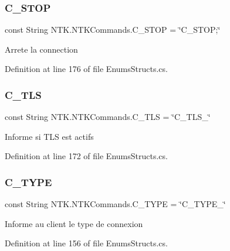 \subsubsection{\texorpdfstring{C\_STOP}{C\_STOP}}
{\footnotesize\ttfamily const String N\+T\+K.\+N\+T\+K\+Commands.\+C\+\_\+\+S\+T\+OP = \char`\"{}C\+\_\+\+S\+T\+OP;\char`\"{}}



Arrete la connection 



Definition at line 176 of file Enums\+Structs.\+cs.

\mbox{\label{struct_n_t_k_1_1_n_t_k_commands_a63df0f0187cf9c5f144468b3e918c6e1}} 
\subsubsection{\texorpdfstring{C\_TLS}{C\_TLS}}
{\footnotesize\ttfamily const String N\+T\+K.\+N\+T\+K\+Commands.\+C\+\_\+\+T\+LS = \char`\"{}C\+\_\+\+T\+L\+S\+\_\+\char`\"{}}



Informe si T\+LS est actifs 



Definition at line 172 of file Enums\+Structs.\+cs.

\mbox{\label{struct_n_t_k_1_1_n_t_k_commands_ab4aae6acfd570c7b4d8263e5d9b21f1a}} 
\subsubsection{\texorpdfstring{C\_TYPE}{C\_TYPE}}
{\footnotesize\ttfamily const String N\+T\+K.\+N\+T\+K\+Commands.\+C\+\_\+\+T\+Y\+PE = \char`\"{}C\+\_\+\+T\+Y\+P\+E\+\_\+\char`\"{}}



Informe au client le type de connexion 



Definition at line 156 of file Enums\+Structs.\+cs.

\mbox{\label{struct_n_t_k_1_1_n_t_k_commands_ab2bb92aaa4af7a574efd15970a422119}} 
